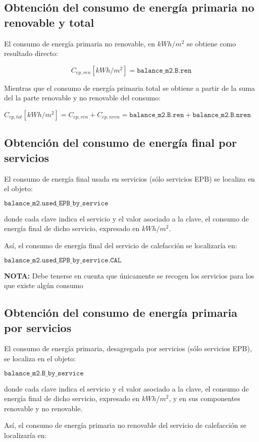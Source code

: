 \documentclass[10pt,notitlepage,oneside,a4paper]{article}
\begin{document}
\subsection{Obtención del consumo de energía primaria no renovable y total}

El consumo de energía primaria no renovable, en $kWh/m^2$ se obtiene como resultado directo:

$$C_{ep,ren} [kWh/m^2] = \texttt{balance\_m2.B.ren}$$

Mientras que el consumo de energía primaria total se obtiene a partir de la suma del la parte renovable y no renovable del consumo:

$C_{ep,tot} [kWh/m^2] = C_{ep,ren} + C_{ep,nren} = \texttt{balance\_m2.B.ren} + \texttt{balance\_m2.B.nren}$

\subsection{Obtención del consumo de energía final por servicios}

El consumo de energía final usada en servicios (sólo servicios EPB) se localiza en el objeto:

$\texttt{balance\_m2.used\_EPB\_by\_service}$

donde cada clave indica el servicio y el valor asociado a la clave, el consumo de energía final de dicho servicio, expresado en $kWh/m^2$.

Así, el consumo de energía final del servicio de calefacción se localizaría en:

$\texttt{balance\_m2.used\_EPB\_by\_service.CAL}$

\textbf{NOTA:} Debe tenerse en cuenta que únicamente se recogen los servicios para los que existe algún consumo

\subsection{Obtención del consumo de energía primaria por servicios}

El consumo de energía primaria, desagregada por servicios (sólo servicios EPB), se localiza en el objeto:

$\texttt{balance\_m2.B\_by\_service}$

donde cada clave indica el servicio y el valor asociado a la clave, el consumo de energía final de dicho servicio, expresado en $kWh/m^2$, y en sus componentes renovable y no renovable.

Así, el consumo de energía primaria no renovable del servicio de calefacción se localizaría en:
\end{document}
